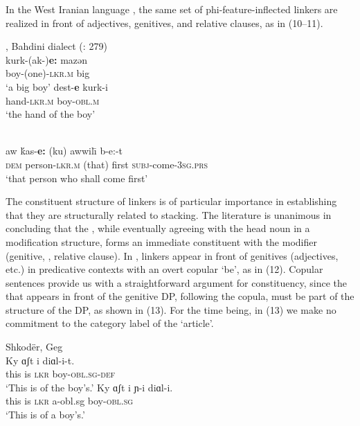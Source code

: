 \documentclass[output=paper]{langsci/langscibook}
\begin{document}
In the West Iranian language  , the same set of phi-feature-inflected linkers are realized in front of adjectives, genitives, and relative clauses, as in (10--11).  

\ea%
     , Bahdini dialect (\citealt{Franco2015}: 279)\label{ex:manzini:10}\\
    \ea
    \gll kurk-(ak-)\textbf{e:}     mazən    \\
         boy-(one){}-\textsc{lkr.m}    big\\
    \glt ‘a big boy’
    \ex  
    \gll dest-\textbf{e}     kurk-i\\
         hand{}-\textsc{lkr.m}    boy{}-\textsc{obl.m} \\
    \glt ‘the hand of the boy’
    \z
\z         

\ea%
      \citep[203]{McKenzie1961}\label{ex:manzini:11}\\
    \gll aw   ḱas-\textbf{e:}     (ku)   {awwil\=\i} b-e:-t\\
         \textsc{dem}   person{}-\textsc{lkr.m}   (that)  first \textsc{subj}-come-\textsc{3sg.prs}\\
    \glt ‘that person who shall come first’
\z

 The constituent structure of linkers is of particular importance in establishing that they are structurally related to stacking. The literature is unanimous in concluding that the , while eventually agreeing with the head noun in a modification structure, forms an immediate constituent with the modifier (genitive, , relative clause). In , linkers appear in front of genitives (adjectives, etc.) in predicative contexts with an overt copular ‘be’, as in (12). Copular sentences provide us with a straightforward argument for constituency, since the  that appears in front of the genitive DP, following the copula, must be part of the structure of the DP, as shown in (13). For the time being, in (13) we make no commitment to the category label of the ‘article’.

\ea%
    Shkodër, Geg \label{ex:manzini:12}\\
    \ea
    \gll Ky   ɑʃt   i   diɑl-i-t.     \\
         this  is  \textsc{lkr}  boy-\textsc{obl.sg-def}   \\
    \glt ‘This is of the boy’s.’  
    \ex
    \gll Ky   ɑʃt   i  ɲ{}-i    diɑl-i.\\
         this  is  \textsc{lkr}  a-obl.sg   boy-\textsc{obl.sg}   \\
    \glt ‘This is of a boy’s.’
    \z
\z
          
\end{document}
